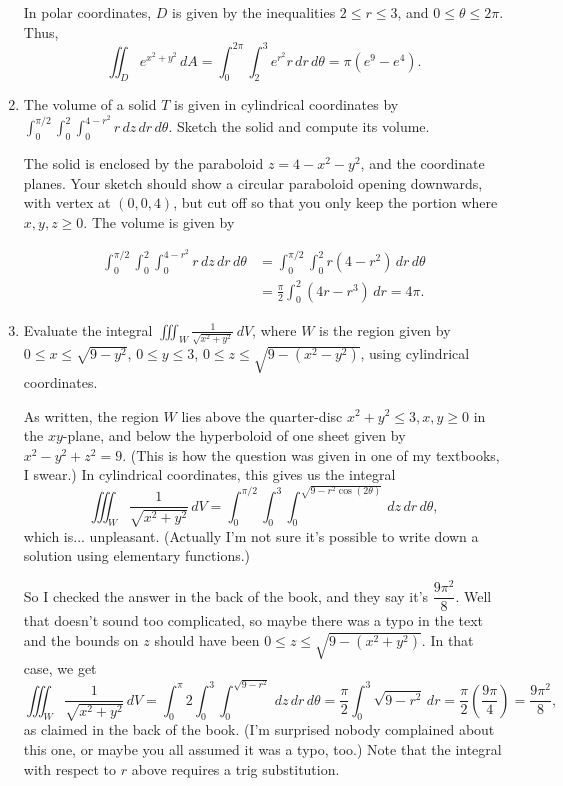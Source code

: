 \documentclass[letterpaper,12pt]{article}
\newcommand{\di}{\displaystyle}
\begin{document}
\begin{enumerate}
In polar coordinates, $D$ is given by the inequalities $2\leq r\leq 3$, and $0\leq \theta\leq 2\pi$. Thus,
\[
 \iint_D e^{x^2+y^2}\,dA = \int_0^{2\pi}\int_2^3 e^{r^2}r\,dr\,d\theta = \pi(e^9-e^4).
\]

 \item The volume of a solid $T$ is given in cylindrical coordinates by $\di \int_0^{\pi/2}\int_0^2\int_0^{4-r^2}r\,dz\,dr\,d\theta$. Sketch the solid and compute its volume.

\bigskip

The solid is enclosed by the paraboloid $z=4-x^2-y^2$, and the coordinate planes. Your sketch should show a circular paraboloid opening downwards, with vertex at $(0,0,4)$, but cut off so that you only keep the portion where $x,y,z\geq 0$. The volume is given by

\begin{align*}
 \int_0^{\pi/2}\int_0^2\int_0^{4-r^2}r\,dz\,dr\,d\theta & = \int_0^{\pi/2}\int_0^2 r(4-r^2)\,dr\,d\theta\\
 & = \frac{\pi}{2}\int_0^2(4r-r^3)\,dr = 4\pi.
\end{align*}

 \item Evaluate the integral $\iiint_W \frac{1}{\sqrt{x^2+y^2}}\,dV$, where $W$ is the region given by $0\leq x\leq \sqrt{9-y^2}$, $0\leq y\leq 3$, $0\leq z\leq \sqrt{9-(x^2-y^2)}$, using cylindrical coordinates.

\bigskip


As written, the region $W$ lies above the quarter-disc $x^2+y^2\leq 3, x,y\geq 0$ in the $xy$-plane, and below the hyperboloid of one sheet given by $x^2-y^2+z^2=9$. (This is how the question was given in one of my textbooks, I swear.) In cylindrical coordinates, this gives us the integral
\[
 \iiint_W \frac{1}{\sqrt{x^2+y^2}}\,dV = \int_0^{\pi/2}\int_0^3\int_0^{\sqrt{9-r^2\cos(2\theta)}}\,dz\,dr\,d\theta,
\]
which is... unpleasant. (Actually I'm not sure it's possible to write down a solution using elementary functions.)


So I checked the answer in the back of the book, and they say it's $\dfrac{9\pi^2}{8}$. Well that doesn't sound too complicated, so maybe there was a typo in the text and the bounds on $z$ should have been $0\leq z\leq \sqrt{9-(x^2+y^2)}$. In that case, we get
\[
 \iiint_W \frac{1}{\sqrt{x^2+y^2}}\,dV = \int_0^{\pi}{2}\int_0^3\int_0^{\sqrt{9-r^2}}\,dz\,dr\,d\theta = \frac{\pi}{2}\int_0^3\sqrt{9-r^2}\,dr = \frac{\pi}{2}\left(\frac{9\pi}{4}\right) = \frac{9\pi^2}{8},
\]
as claimed in the back of the book. (I'm surprised nobody complained about this one, or maybe you all assumed it was a typo, too.) Note that the integral with respect to $r$ above requires a trig substitution.



\end{enumerate}
\end{document}
